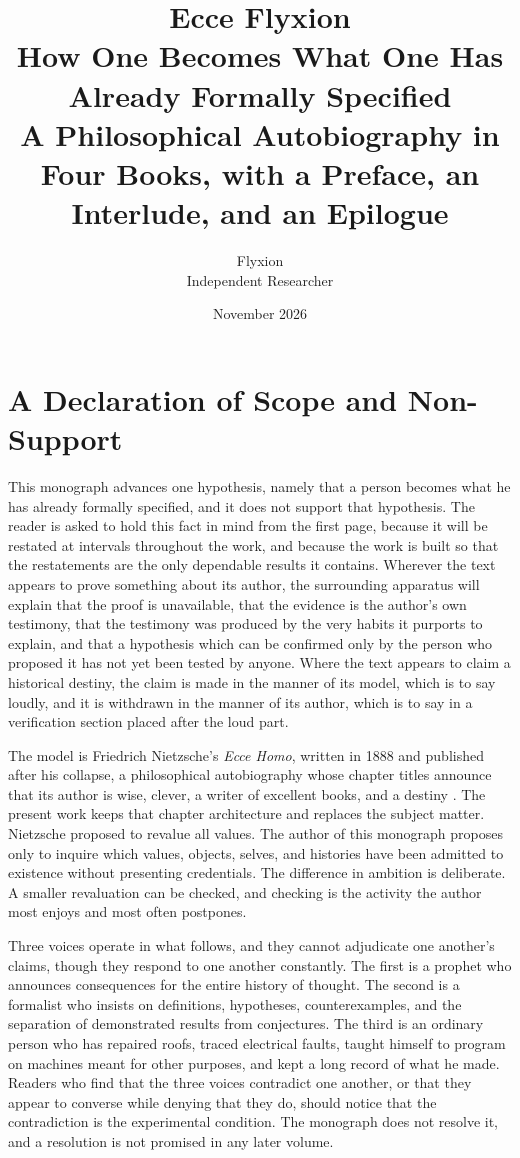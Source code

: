 \documentclass[11pt,openany,twoside]{book}
\title{\Huge Ecce Flyxion\\[1.2ex]\Large How One Becomes What One Has Already Formally Specified\\[2ex]\large A Philosophical Autobiography in Four Books, with a Preface, an Interlude, and an Epilogue}
\author{Flyxion\\ \small Independent Researcher}
\date{November 2026}
\theoremstyle{plain}
\theoremstyle{definition}
\theoremstyle{remark}
\begin{document}
\frontmatter
\maketitle

\chapter*{A Declaration of Scope and Non-Support}

This monograph advances one hypothesis, namely that a person becomes what he has already formally specified, and it does not support that hypothesis. The reader is asked to hold this fact in mind from the first page, because it will be restated at intervals throughout the work, and because the work is built so that the restatements are the only dependable results it contains. Wherever the text appears to prove something about its author, the surrounding apparatus will explain that the proof is unavailable, that the evidence is the author's own testimony, that the testimony was produced by the very habits it purports to explain, and that a hypothesis which can be confirmed only by the person who proposed it has not yet been tested by anyone. Where the text appears to claim a historical destiny, the claim is made in the manner of its model, which is to say loudly, and it is withdrawn in the manner of its author, which is to say in a verification section placed after the loud part.

The model is Friedrich Nietzsche's \emph{Ecce Homo}, written in 1888 and published after his collapse, a philosophical autobiography whose chapter titles announce that its author is wise, clever, a writer of excellent books, and a destiny \cite{nietzsche-ecce}. The present work keeps that chapter architecture and replaces the subject matter. Nietzsche proposed to revalue all values. The author of this monograph proposes only to inquire which values, objects, selves, and histories have been admitted to existence without presenting credentials. The difference in ambition is deliberate. A smaller revaluation can be checked, and checking is the activity the author most enjoys and most often postpones.

Three voices operate in what follows, and they cannot adjudicate one another's claims, though they respond to one another constantly. The first is a prophet who announces consequences for the entire history of thought. The second is a formalist who insists on definitions, hypotheses, counterexamples, and the separation of demonstrated results from conjectures. The third is an ordinary person who has repaired roofs, traced electrical faults, taught himself to program on machines meant for other purposes, and kept a long record of what he made. Readers who find that the three voices contradict one another, or that they appear to converse while denying that they do, should notice that the contradiction is the experimental condition. The monograph does not resolve it, and a resolution is not promised in any later volume.
\end{document}

